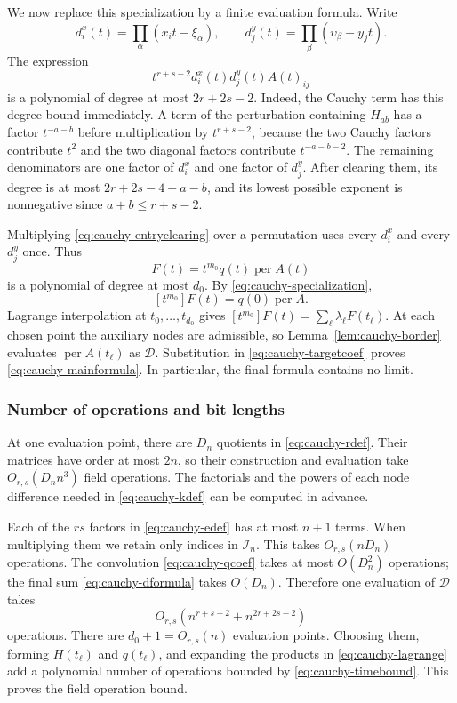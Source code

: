 \documentclass[11pt,reqno]{amsart}
\theoremstyle{remark}
\numberwithin{equation}{section}
\newcommand{\per}{\operatorname{per}}
\newcommand{\calI}{\mathcal I}
\newcommand{\calD}{\mathcal D}
\begin{document}
We now replace this specialization by a finite evaluation formula.
Write
\[
 d_i^x(t)=\prod_\alpha(x_it-\xi_\alpha),\qquad
 d_j^y(t)=\prod_\beta(\upsilon_\beta-y_jt).
\]
The expression
\begin{equation}\label{eq:cauchy-entryclearing}
 t^{r+s-2}d_i^x(t)d_j^y(t)A(t)_{ij}
\end{equation}
is a polynomial of degree at most $2r+2s-2$.
Indeed, the Cauchy term has this degree bound immediately.
A term of the perturbation containing $H_{ab}$ has a factor
$t^{-a-b}$ before multiplication by $t^{r+s-2}$, because the
two Cauchy factors contribute $t^2$ and the two diagonal factors
contribute $t^{-a-b-2}$. The remaining denominators are one
factor of $d_i^x$ and one factor of $d_j^y$. After clearing them,
its degree is at most $2r+2s-4-a-b$, and its lowest possible
exponent is nonnegative since $a+b\leq r+s-2$.

Multiplying \eqref{eq:cauchy-entryclearing} over a permutation uses every
$d_i^x$ and every $d_j^y$ once. Thus
\begin{equation}\label{eq:cauchy-fpoly}
 F(t)=t^{m_0}q(t)\per A(t)
\end{equation}
is a polynomial of degree at most $d_0$. By
\eqref{eq:cauchy-specialization},
\begin{equation}\label{eq:cauchy-targetcoef}
 [t^{m_0}]F(t)=q(0)\per A.
\end{equation}
Lagrange interpolation at $t_0,\ldots,t_{d_0}$ gives
$[t^{m_0}]F(t)=\sum_\ell\lambda_\ell F(t_\ell)$.
At each chosen point the auxiliary nodes are admissible, so
Lemma~\ref{lem:cauchy-border} evaluates $\per A(t_\ell)$ as $\calD$.
Substitution in \eqref{eq:cauchy-targetcoef} proves \eqref{eq:cauchy-mainformula}.
In particular, the final formula contains no limit.

\subsubsection{Number of operations and bit lengths}
At one evaluation point, there are $D_n$ quotients in
\eqref{eq:cauchy-rdef}. Their matrices have order at most $2n$, so their
construction and evaluation take $O_{r,s}(D_n n^3)$ field
operations. The factorials and the powers of each node difference
needed in \eqref{eq:cauchy-kdef} can be computed in advance.

Each of the $rs$ factors in \eqref{eq:cauchy-edef} has at most $n+1$
terms. When multiplying them we retain only indices in $\calI_n$.
This takes $O_{r,s}(nD_n)$ operations. The convolution
\eqref{eq:cauchy-qcoef} takes at most $O(D_n^2)$ operations; the final sum
\eqref{eq:cauchy-dformula} takes $O(D_n)$. Therefore one evaluation of
$\calD$ takes
\[
 O_{r,s}(n^{r+s+2}+n^{2r+2s-2})
\]
operations. There are $d_0+1=O_{r,s}(n)$ evaluation points.
Choosing them, forming $H(t_\ell)$ and $q(t_\ell)$, and expanding
the products in \eqref{eq:cauchy-lagrange} add a polynomial number of
operations bounded by \eqref{eq:cauchy-timebound}. This proves the field
operation bound.
\end{document}
